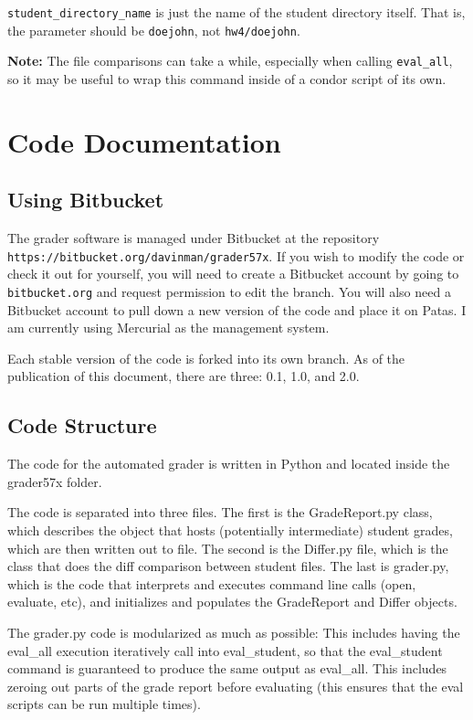 \documentclass[12pt]{article}
\begin{document}
\texttt{student\_directory\_name} is just the name of the student directory itself. That is, the parameter should be \texttt{doejohn}, not \texttt{hw4/doejohn}.

\textbf{Note:} The file comparisons can take a while, especially when calling \texttt{eval\_all}, so it may be useful to wrap this command inside of a condor script of its own.

\section{Code Documentation} \label{sec:documentation}

\subsection{Using Bitbucket} \label{sec:bitbucket}

The grader software is managed under Bitbucket at the repository \\ \texttt{https://bitbucket.org/davinman/grader57x}. If you wish to modify the code or check it out for yourself, you will need to create a Bitbucket account by going to \texttt{bitbucket.org} and request permission to edit the branch. You will also need a Bitbucket account to pull down a new version of the code and place it on Patas. I am currently using Mercurial as the management system.

Each stable version of the code is forked into its own branch. As of the publication of this document, there are three: 0.1, 1.0, and 2.0.

\subsection{Code Structure} \label{sec:structure}

The code for the automated grader is written in Python and located inside the grader57x folder.

The code is separated into three files. The first is the GradeReport.py class, which describes the object that hosts (potentially intermediate) student grades, which are then written out to file. The second is the Differ.py file, which is the class that does the diff comparison between student files. The last is grader.py, which is the code that interprets and executes command line calls (open, evaluate, etc), and initializes and populates the GradeReport and Differ objects.

The grader.py code is modularized as much as possible: This includes having the eval\_all execution iteratively call into eval\_student, so that the eval\_student command is guaranteed to produce the same output as eval\_all. This includes zeroing out parts of the grade report before evaluating (this ensures that the eval scripts can be run multiple times).
\end{document}
